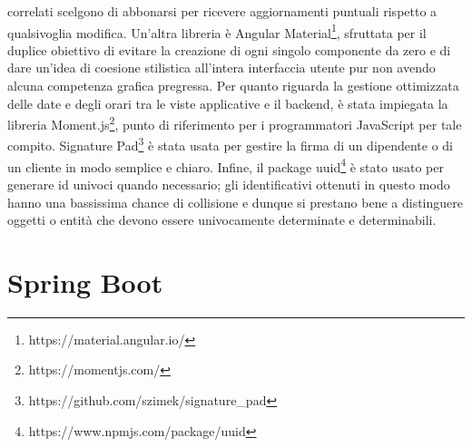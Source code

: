 correlati scelgono di abbonarsi per ricevere aggiornamenti puntuali rispetto a qualsivoglia modifica.
Un'altra libreria è Angular Material\footnote{https://material.angular.io/}, sfruttata per il duplice obiettivo di evitare la creazione di ogni singolo componente da zero e di
dare un'idea di coesione stilistica all'intera interfaccia utente pur non avendo alcuna competenza grafica pregressa.
Per quanto riguarda la gestione ottimizzata delle date e degli orari tra le viste applicative e il backend, è stata impiegata la libreria Moment.js\footnote{https://momentjs.com/}, 
punto di riferimento per i programmatori JavaScript per tale compito.
Signature Pad\footnote{https://github.com/szimek/signature\_pad} è stata usata per gestire la firma di un dipendente o di un cliente in modo semplice e chiaro.
Infine, il package uuid\footnote{https://www.npmjs.com/package/uuid} è stato usato per generare id univoci quando necessario; gli identificativi ottenuti in questo modo hanno 
una bassissima chance di collisione e dunque si prestano bene a distinguere oggetti o entità che devono essere univocamente determinate e determinabili.

\section{Spring Boot}

